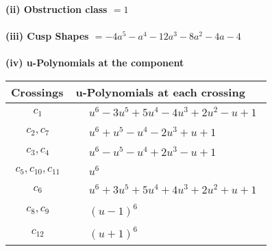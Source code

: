 \documentclass[1p]{elsarticle_modified}
\theoremstyle{definition}
\begin{document}
\flushleft \textbf{(ii) Obstruction class $= 1$}\\~\\
\flushleft \textbf{(iii) Cusp Shapes $= -4 a^5- a^4-12 a^3-8 a^2-4 a-4$}\\~\\
\newpage\renewcommand{\arraystretch}{1}
\flushleft \textbf{(iv) u-Polynomials at the component}\newline \\
\begin{tabular}{m{50pt}|m{274pt}}
Crossings & \hspace{64pt}u-Polynomials at each crossing \\
\hline $$\begin{aligned}c_{1}\end{aligned}$$&$\begin{aligned}
&u^6-3 u^5+5 u^4-4 u^3+2 u^2- u+1
\end{aligned}$\\
\hline $$\begin{aligned}c_{2},c_{7}\end{aligned}$$&$\begin{aligned}
&u^6+u^5- u^4-2 u^3+u+1
\end{aligned}$\\
\hline $$\begin{aligned}c_{3},c_{4}\end{aligned}$$&$\begin{aligned}
&u^6- u^5- u^4+2 u^3- u+1
\end{aligned}$\\
\hline $$\begin{aligned}c_{5},c_{10},c_{11}\end{aligned}$$&$\begin{aligned}
&u^6
\end{aligned}$\\
\hline $$\begin{aligned}c_{6}\end{aligned}$$&$\begin{aligned}
&u^6+3 u^5+5 u^4+4 u^3+2 u^2+u+1
\end{aligned}$\\
\hline $$\begin{aligned}c_{8},c_{9}\end{aligned}$$&$\begin{aligned}
&(u-1)^6
\end{aligned}$\\
\hline $$\begin{aligned}c_{12}\end{aligned}$$&$\begin{aligned}
&(u+1)^6
\end{aligned}$\\
\hline
\end{tabular}\\~\\
\end{document}
